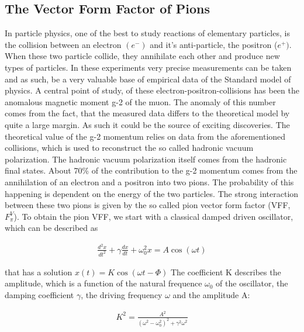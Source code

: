 \documentclass[a4paper]{article}
\begin{document}
\subsection{The Vector Form Factor of Pions}

In particle physics, one of the best to study reactions of elementary
particles, is the collision between an electron $(e^-)$ and it's anti-particle,
the positron ($e^+)$. When these two particle collide, they annihilate each
other and produce new types of particles. In these experiments very precise
measurements can be taken and as such, be a very valuable base of empirical
data of the Standard model of physics. A central point of study, of these
electron-positron-collisions has been the anomalous magnetic moment g-2 of the
muon. The anomaly of this number comes from the fact, that the measured data
differs to the theoretical model by quite a large margin. As such it could be
the source of exciting discoveries. The theoretical value of the g-2 momentum
relies on data from the aforementioned collisions, which is used to reconstruct
the so called hadronic vacuum polarization. The hadronic vacuum polarization
itself comes from the hadronic final states. About 70\% of the contribution to
the g-2 momentum comes from the annihilation of an electron and a positron into
two pions. The probability of this happening is dependent on the energy of the
two particles. The strong interaction between these two pions is given by the
so called pion vector form factor (VFF, $F_\pi^V$). To obtain the pion VFF, we
start with a classical damped driven oscillator, which can be described as

\begin{align}
\frac{d^2x}{dt^2}+\gamma\frac{dx}{dt}+\omega_0^2x=A\cos{(\omega t)}
\end{align}

that has a solution $x(t)=K\cos{(\omega t-\Phi)}$ The coefficient K describes the
amplitude, which is a function of the natural frequence $\omega_0$ of the
oscillator, the damping coefficient $\gamma$, the driving frequency $\omega$
and the amplitude A:

\begin{align}
K^2=\frac{A^2}{(\omega^2-\omega_0^2)^2+\gamma^2\omega^2}
\end{align}
\end{document}
